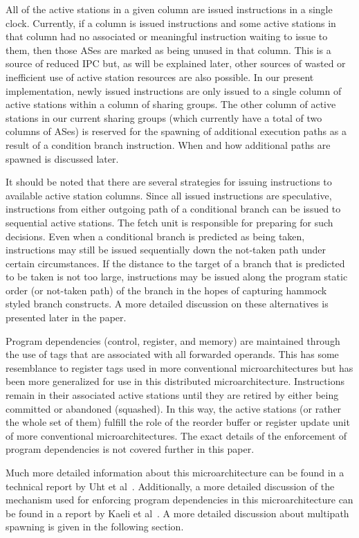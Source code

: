 \documentclass[10pt,dvips]{article}
\begin{document}
All of the active stations in a given column are issued instructions
in a single clock.  Currently, if a column is issued instructions
and some
active stations in that column had no associated or meaningful
instruction waiting to issue to them, then those ASes are marked
as being unused in that column.  This is a source of reduced IPC but, as will
be explained later, other sources of wasted or inefficient use of
active station resources are also possible.
In our present implementation, newly issued instructions
are only issued to a single column of active stations within
a column of sharing groups.  The other column of active stations
in our current sharing groups (which currently have a total
of two columns of ASes) is reserved for the spawning of additional
execution paths as a result of a condition branch instruction.
When and how additional paths are spawned is discussed later.

It should be noted that there are several strategies for
issuing instructions to available active station columns.
Since all issued instructions are speculative, instructions
from either outgoing path of a conditional branch can be issued
to sequential active stations.
The fetch unit is responsible for preparing for such decisions.
Even when a conditional branch is predicted as being taken,
instructions may still be issued sequentially down the not-taken
path under certain circumstances.  If the distance to the target 
of a branch
that is predicted to be taken is not too large,
instructions may be issued along the program static order (or not-taken
path) of the branch in the hopes of capturing hammock styled branch
constructs.  A more detailed discussion on these alternatives is
presented later in the paper.

Program dependencies (control, register, and memory) are 
maintained through the use of tags that
are associated with all forwarded operands.
This has some resemblance to register tags used in more conventional 
microarchitectures but has been more generalized for use in this
distributed microarchitecture.  Instructions remain in their
associated active stations until they are retired by either being
committed or abandoned (squashed).  In this way, the active stations
(or rather the whole set of them)
fulfill the role of the reorder buffer or register update unit of more
conventional microarchitectures.
The exact details of the enforcement of program dependencies
is not covered further in this paper.

Much more detailed information about this microarchitecture
can be found in a technical report by Uht et al~\cite{Uht01}.
Additionally, a more detailed discussion of the mechanism used for
enforcing program dependencies in this microarchitecture
can be found in a report by Kaeli et al~\cite{Uht01}.
A more detailed discussion about multipath spawning is given
in the following section.
%
\end{document}
